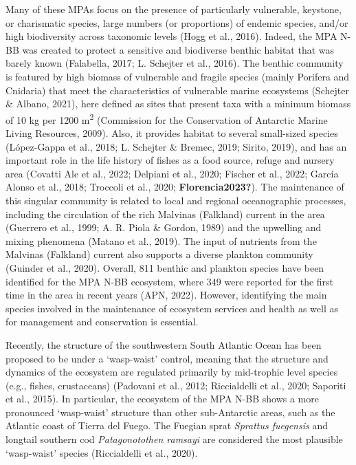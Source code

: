 \documentclass[preprint, 3p,
authoryear]{elsarticle} %
\begin{document}
Many of these MPAs focus on the presence of particularly vulnerable,
keystone, or charismatic species, large numbers (or proportions) of
endemic species, and/or high biodiversity across taxonomic levels (Hogg
et al., 2016). Indeed, the MPA N-BB was created to protect a sensitive
and biodiverse benthic habitat that was barely known (Falabella, 2017;
L. Schejter et al., 2016). The benthic community is featured by high
biomass of vulnerable and fragile species (mainly Porifera and Cnidaria)
that meet the characteristics of vulnerable marine ecosystems (Schejter
\& Albano, 2021), here defined as sites that present taxa with a minimum
biomass of 10 kg per 1200 m\textsuperscript{2} (Commission for the
Conservation of Antarctic Marine Living Resources, 2009). Also, it
provides habitat to several small-sized species (López-Gappa et al.,
2018; L. Schejter \& Bremec, 2019; Sirito, 2019), and has an important
role in the life history of fishes as a food source, refuge and nursery
area (Covatti Ale et al., 2022; Delpiani et al., 2020; Fischer et al.,
2022; García Alonso et al., 2018; Troccoli et al., 2020;
\textbf{Florencia2023?}). The maintenance of this singular community is
related to local and regional oceanographic processes, including the
circulation of the rich Malvinas (Falkland) current in the area
(Guerrero et al., 1999; A. R. Piola \& Gordon, 1989) and the upwelling
and mixing phenomena (Matano et al., 2019). The input of nutrients from
the Malvinas (Falkland) current also supports a diverse plankton
community (Guinder et al., 2020). Overall, 811 benthic and plankton
species have been identified for the MPA N-BB ecosystem, where 349 were
reported for the first time in the area in recent years (APN, 2022).
However, identifying the main species involved in the maintenance of
ecosystem services and health as well as for management and conservation
is essential.

Recently, the structure of the southwestern South Atlantic Ocean has
been proposed to be under a `wasp-waist' control, meaning that the
structure and dynamics of the ecosystem are regulated primarily by
mid-trophic level species (e.g., fishes, crustaceans) (Padovani et al.,
2012; Riccialdelli et al., 2020; Saporiti et al., 2015). In particular,
the ecosystem of the MPA N-BB shows a more pronounced `wasp-waist'
structure than other sub-Antarctic areas, such as the Atlantic coast of
Tierra del Fuego. The Fuegian sprat \emph{Sprattus fuegensis} and
longtail southern cod \emph{Patagonotothen ramsayi} are considered the
most plausible `wasp-waist' species (Riccialdelli et al., 2020).
\end{document}
